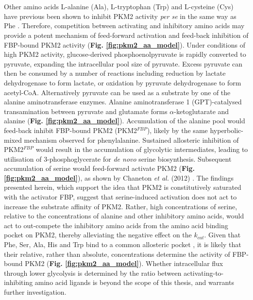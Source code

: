 %
%
\\\\
%
%
Other amino acids L-alanine (Ala), L-tryptophan (Trp) and L-cysteine (Cys) have previous been shown to inhibit PKM2 activity \textit{per se} in the same way as Phe \cite{Yuan:2018aa}. Therefore, competition between activating and inhibitory amino acids may provide a potent mechanism of feed-forward activation and feed-back inhibition of FBP-bound PKM2 activity (\textbf{Fig. \ref{fig:pkm2_aa_model}}). Under conditions of high PKM2 activity, glucose-derived phosphoenolpyruvate is rapidly converted to pyruvate, expanding the intracellular pool size of pyruvate. Excess pyruvate can then be consumed by a number of reactions including reduction by lactate dehydrogenase to form lactate, or oxidation by pyruvate dehydrogenase to form acetyl-CoA. Alternatively pyruvate can be used as a substrate by one of the alanine aminotransferase enzymes. Alanine aminotransferase 1 (GPT)-catalysed transamination between pyruvate and glutamate forms $\alpha$-ketoglutarate and alanine (\textbf{Fig. \ref{fig:pkm2_aa_model}}). Accumulation of the alanine pool would feed-back inhibit FBP-bound PKM2 (PKM2$^{FBP}$), likely by the same hyperbolic-mixed mechanism observed for phenylalanine. Sustained allosteric inhibition of PKM2$^{FBP}$ would result in the accumulation of glycolytic intermediates, leading to utilisation of 3-phosphoglycerate for \textit{de novo} serine biosynthesis. Subsequent accumulation of serine would feed-forward activate PKM2  (\textbf{Fig. \ref{fig:pkm2_aa_model}}), as shown by Chaneton \textit{et al.} (2012) \cite{Chaneton:2012aa}. The findings presented herein, which support the idea that PKM2 is constitutively saturated with the activator FBP, suggest that serine-induced activation does not act to increase the substrate affinity of PKM2. Rather, high concentrations of serine, relative to the concentrations of alanine and other inhibitory amino acids, would act to out-compete the inhibitory amino acids from the amino acid binding pocket on PKM2, thereby alleviating the negative effect on the $k_{cat}$. Given that Phe, Ser, Ala, His and Trp bind to a common allosteric pocket \cite{Yuan:2018aa}, it is likely that their relative, rather than absolute, concentrations determine the activity of FBP-bound PKM2 (\textbf{Fig. \ref{fig:pkm2_aa_model}}). Whether intracellular flux through lower glycolysis is determined by the ratio between activating-to-inhibiting amino acid ligands is beyond the scope of this thesis, and warrants further investigation.
%
%
%
